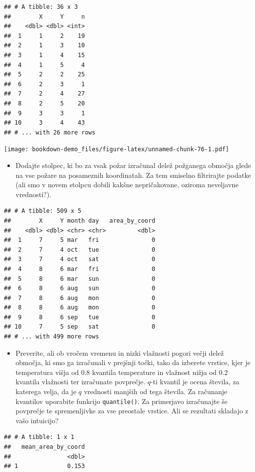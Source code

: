 \documentclass[
]{book}
\providecommand{\tightlist}{%
  \setlength{\itemsep}{0pt}\setlength{\parskip}{0pt}}
\begin{document}
\begin{enumerate}
\begin{verbatim}
## # A tibble: 36 x 3
##        X     Y     n
##    <dbl> <dbl> <int>
##  1     1     2    19
##  2     1     3    10
##  3     1     4    15
##  4     1     5     4
##  5     2     2    25
##  6     2     3     1
##  7     2     4    27
##  8     2     5    20
##  9     3     3     1
## 10     3     4    43
## # ... with 26 more rows
\end{verbatim}

  \texttt{[image: bookdown-demo\_files/figure-latex/unnamed-chunk-76-1.pdf]}

  \begin{itemize}
  \tightlist
  \item
    Dodajte stolpec, ki bo za vsak požar izračunal delež požganega območja glede na vse požare na posameznih koordinatah. Za tem smiselno filtrirajte podatke (ali smo v novem stolpcu dobili kakšne nepričakovane, oziroma neveljavne vrednosti?).
  \end{itemize}

\begin{verbatim}
## # A tibble: 509 x 5
##        X     Y month day   area_by_coord
##    <dbl> <dbl> <chr> <chr>         <dbl>
##  1     7     5 mar   fri               0
##  2     7     4 oct   tue               0
##  3     7     4 oct   sat               0
##  4     8     6 mar   fri               0
##  5     8     6 mar   sun               0
##  6     8     6 aug   sun               0
##  7     8     6 aug   mon               0
##  8     8     6 aug   mon               0
##  9     8     6 sep   tue               0
## 10     7     5 sep   sat               0
## # ... with 499 more rows
\end{verbatim}

  \begin{itemize}
  \tightlist
  \item
    Preverite, ali ob vročem vremenu in nizki vlažnosti pogori večji delež območja, ki smo ga izračunali v prejšnji točki, tako da izberete vrstice, kjer je temperatura višja od 0.8 kvantila temperature in vlažnost nižja od 0.2 kvantila vlažnosti ter izračunate povprečje. \(q\)-ti kvantil je ocena števila, za katerega velja, da je \(q\) vrednosti manjših od tega števila. Za računanje kvantilov uporabite funkcijo \texttt{quantile()}. Za primerjavo izračunajte še povprečje te spremenljivke za vse preostale vrstice. Ali se rezultati skladajo z vašo intuicijo?
  \end{itemize}

\begin{verbatim}
## # A tibble: 1 x 1
##   mean_area_by_coord
##                <dbl>
## 1              0.153
\end{verbatim}


\end{enumerate}
\end{document}
